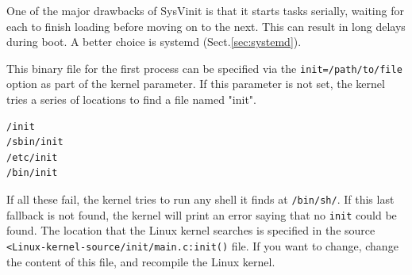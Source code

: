 \begin{mdframed}

One of the major drawbacks of SysVinit is that it starts tasks serially, waiting
for each to finish loading before moving on to the next. This can result in long
delays during boot. A better choice is systemd (Sect.\ref{sec:systemd}).

\end{mdframed}

This binary file for the first process can be specified via the
\verb!init=/path/to/file! option as part of the kernel parameter.  If this
parameter is not set, the kernel tries a series of locations to find a file
named "init".
\begin{verbatim}
/init
/sbin/init
/etc/init
/bin/init
\end{verbatim}
If all these fail, the kernel tries to run any shell it finds at \verb!/bin/sh/!.
If this last fallback is not found, the kernel will print an error saying that
no \verb!init! could be found.
The location that the Linux kernel searches is specified in the source
\verb!<Linux-kernel-source/init/main.c:init()! file.
If you want to change, change the content of this file, and recompile the Linux
kernel.

% 
 


